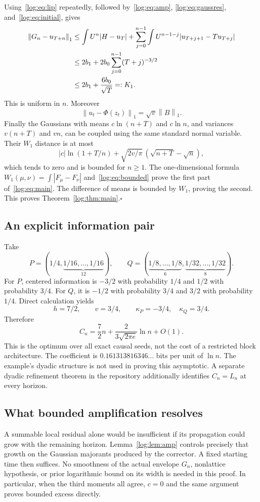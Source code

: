 \documentclass[11pt,a4paper]{article}
\theoremstyle{definition}\newtheorem{definition}[theorem]{Definition}
\theoremstyle{remark}\newtheorem{remark}[theorem]{Remark}
\newcommand{\norm}[1]{\left\|#1\right\|_1}
\numberwithin{equation}{section}
\begin{document}
Using~\eqref{log:eq:lip} repeatedly, followed by~\eqref{log:eq:amp},
\eqref{log:eq:gaussres}, and~\eqref{log:eq:initial}, gives
\begin{align}
 \norm{G_n-u_{T+n}}
 &\le\int U^n|H-u_T|
    +\sum_{j=0}^{n-1}\int U^{n-1-j}|u_{T+j+1}-Tu_{T+j}|\notag\\
 &\le2b_1+2b_0\sum_{j=0}^{n-1}(T+j)^{-3/2}\notag\\
 &\le2b_1+\frac{6b_0}{\sqrt T}=:K_1.\label{log:eq:bounded}
\end{align}
This is uniform in $n$. Moreover
\[
 \norm{u_t-\Phi(z_t)}=\sqrt v\norm B.
\]
Finally the Gaussians with means $c\ln(n+T)$ and $c\ln n$,
and variances $v(n+T)$ and $vn$, can be coupled using the same
standard normal variable. Their $W_1$ distance is at most
\[
 |c|\ln(1+T/n)
 +\sqrt{2v/\pi}\,(\sqrt{n+T}-\sqrt n),
\]
which tends to zero and is bounded for $n\ge1$.
The one-dimensional formula $W_1(\mu,\nu)=\int|F_\mu-F_\nu|$
and~\eqref{log:eq:bounded} prove the first part of~\eqref{log:eq:main}.
The difference of means is bounded by $W_1$, proving the second.
This proves Theorem~\ref{log:thm:main}.\hfill$\square$



\subsection{An explicit information pair}
Take
\[
 P=(1/4,\underbrace{1/16,\ldots,1/16}_{12}),\qquad
 Q=(\underbrace{1/8,\ldots,1/8}_{6},
       \underbrace{1/32,\ldots,1/32}_{8}).
\]
For $P$, centered information is $-3/2$ with probability $1/4$ and
$1/2$ with probability $3/4$. For $Q$, it is $-1/2$ with probability
$3/4$ and $3/2$ with probability $1/4$. Direct calculation yields
\[
 h=7/2,\qquad v=3/4,\qquad \kappa_P=-3/4,\quad\kappa_Q=3/4.
\]
Therefore
\[
 \boxed{C_n=\frac72 n+\frac{2}{3\sqrt{2\pi e}}\ln n+O(1).}
\]
This is the optimum over all exact causal seeds, not the cost of a
restricted block architecture. The coefficient is
$0.161313816346\ldots$ bits per unit of $\ln n$.
The example's dyadic structure is not used in proving this asymptotic.
A separate dyadic refinement theorem in the repository additionally
identifies $C_n=L_n$ at every horizon.

\subsection{What bounded amplification resolves}
A summable local residual alone would be insufficient if its propagation
could grow with the remaining horizon. Lemma~\ref{log:lem:amp} controls
precisely that growth on the Gaussian majorants produced by the corrector.
A fixed starting time then suffices. No smoothness of the actual envelope
$G_n$, nonlattice hypothesis, or prior logarithmic bound on its width is
needed in this proof. In particular, when the third moments all agree,
$c=0$ and the same argument proves bounded excess directly.
\end{document}
